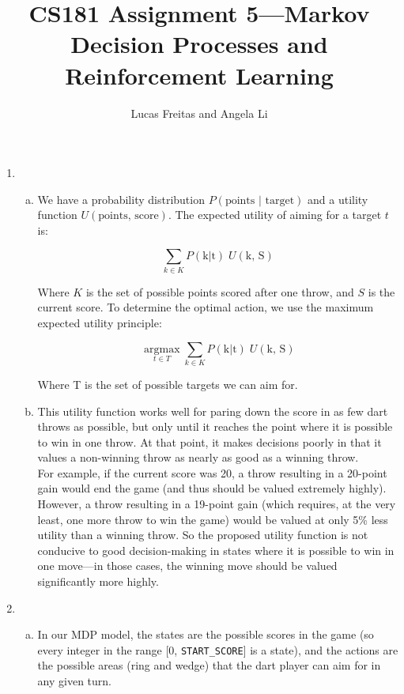 \documentclass{article}
\title{CS181 Assignment 5---Markov Decision Processes and Reinforcement Learning}
\author{Lucas Freitas and Angela Li}
\begin{document}
\maketitle
    
    \begin{enumerate}
        \item
            \begin{enumerate}[(a)]
                \item We have a probability distribution $P(\text{points } | \text{ target})$ and a utility function $U(\text{points, score})$. The expected utility of aiming for a target $t$ is:

                $$\sum_{k \in K} P(\text{k} | \text{t}) \; U(\text{k, S})$$

                Where $K$ is the set of possible points scored after one throw, and $S$ is the current score. To determine the optimal action, we use the maximum expected utility principle:

                $$\underset{t \in T}{\operatorname{argmax}} \sum_{k \in K} P(\text{k} | \text{t}) \; U(\text{k, S})$$

                Where T is the set of possible targets we can aim for.

                \item This utility function works well for paring down the score in as few dart throws as possible, but only until it reaches the point where it is possible to win in one throw. At that point, it makes decisions poorly in that it values a non-winning throw as nearly as good as a winning throw. \\

                For example, if the current score was 20, a throw resulting in a 20-point gain would end the game (and thus should be valued extremely highly). However, a throw resulting in a 19-point gain (which requires, at the very least, one more throw to win the game) would be valued at only 5\% less utility than a winning throw. So the proposed utility function is not conducive to good decision-making in states where it is possible to win in one move---in those cases, the winning move should be valued significantly more highly.
            \end{enumerate}
        \item
            \begin{enumerate}[(a)]
                \item In our MDP model, the states are the possible scores in the game (so every integer in the range [0, \texttt{START\_SCORE}] is a state), and the actions are the possible areas (ring and wedge) that the dart player can aim for in any given turn. \\


\end{enumerate}
\end{enumerate}
\end{document}
